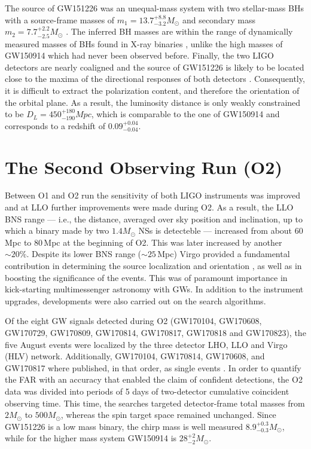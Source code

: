 \documentclass[binding=0.6cm, LaM]{sapthesis}
\begin{document}
	The source of GW151226 was an unequal-mass system with two stellar-mass BHs 
	with a source-frame masses of $m_1 = 13.7^{+8.8}_{-3.2}M_\odot$ 
	and secondary mass $m_2 = 7.7^{+2.2}_{-2.5}M_\odot$ \cite{13}. 
	The inferred BH masses are within the range of dynamically measured masses 
	of BHs found in X-ray binaries \cite{128-132}, 
	unlike the high masses of GW150914 which had never been observed before. 
	Finally, the two LIGO detectors are nearly coaligned and the source of GW151226 
	is likely to be located close to the maxima of the directional responses of both detectors \cite{28}. 
	Consequently, it is difficult to extract the polarization content, and therefore the orientation of the orbital plane. 
	As a result, the luminosity distance is only weakly constrained to be $D_L = 450^{+180}_{-190}Mpc$, 
	which is comparable to the one of GW150914 and corresponds to a redshift of $0.09^{+0.04}_{-0.04}$.


\section{The Second Observing Run (O2)}

	Between O1 and O2 run the sensitivity of both LIGO instruments was improved and 
	at LLO further improvements were made during O2. 
	As a result, the LLO BNS range --- i.e., the distance, averaged over sky position and inclination, 
	up to which a binary made by two $1.4M_\odot$ NSs is detecteble --- 
	increased from about 60\,Mpc to 80\,Mpc at the beginning of O2.  
	This was later increased by another $\sim 20\%$.
 	Despite its lower BNS range ($\sim 25\,$Mpc) Virgo provided a fundamental contribution 
	in determining the source localization and orientation \cite{56}, 
	as well as in boosting the significance of the events. 
	This was of paramount importance in kick-starting multimessenger astronomy with GWs.
	In addition to the instrument upgrades, developments were also carried out on
	the search algorithms.
 
	Of the eight GW signals detected during O2 
	(GW170104, GW170608, GW170729, GW170809, GW170814, GW170817, GW170818 and GW170823), 
	the five August events were localized by the three detector LHO, LLO and Virgo (HLV) network.  
	Additionally, GW170104, GW170814, GW170608, and GW170817 where published, 
	in that order, as single events \cite{60,61,62,138}.   
	In order to quantify the FAR with an accuracy that enabled the claim of confident detections, 
	the O2 data was divided into periods of 5 days of two-detector cumulative coincident observing time.
	This time, the searches targeted  detector-frame total masses from $2M_\odot$ to $500 M_\odot$, 
	whereas the spin target space remained unchanged.
	Since GW151226 is a low mass binary, the chirp  mass is well measured $8.9^{+0.3}_{-0.3} M_\odot$,
	while for the higher mass system GW150914 is $28^{+2}_{-2}M_\odot$.
\end{document}
